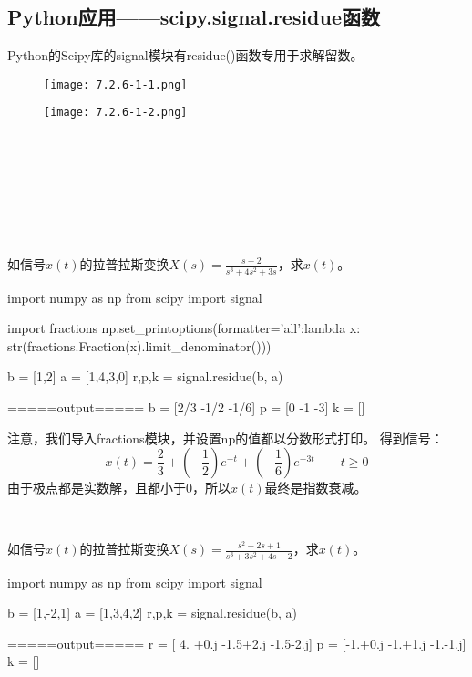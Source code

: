 \subsection{Python应用——scipy.signal.residue函数}

Python的Scipy库的signal模块有residue()函数专用于求解留数。
\begin{figure}[h]
\centering
\texttt{[image: 7.2.6-1-1.png]}
\end{figure}
\begin{figure}[ht]
\centering
\texttt{[image: 7.2.6-1-2.png]}
\end{figure}

~

~

~

~

\begin{example}
如信号$x\left( t \right) $的拉普拉斯变换$X\left( s \right) =\frac{s+2}{s^3+4s^2+3s}$，求$x\left( t \right) $。
\end{example}

\begin{python}
import numpy as np
from scipy import signal

import fractions
np.set_printoptions(formatter={'all':lambda x: str(fractions.Fraction(x).limit_denominator())})

b = [1,2]
a = [1,4,3,0]
r,p,k = signal.residue(b, a)

=====output=====
b = [2/3 -1/2 -1/6]
p = [0 -1 -3]
k = []
\end{python}

注意，我们导入fractions模块，并设置np的值都以分数形式打印。
得到信号：
\[
x\left( t \right) =\frac{2}{3}+\left( -\frac{1}{2} \right) e^{-t}+\left( -\frac{1}{6} \right) e^{-3t} \qquad t\geqslant 0
\]
由于极点都是实数解，且都小于0，所以$x\left( t \right) $最终是指数衰减。

~

\begin{example}
如信号$x\left( t \right) $的拉普拉斯变换$X\left( s \right) =\frac{s^2-2s+1}{s^3+3s^2+4s+2}$，求$x\left( t \right) $。
\end{example}

\begin{python}
import numpy as np
from scipy import signal

b = [1,-2,1]
a = [1,3,4,2]
r,p,k = signal.residue(b, a)

=====output=====
r = [ 4. +0.j -1.5+2.j -1.5-2.j]
p = [-1.+0.j -1.+1.j -1.-1.j]
k = []
\end{python}

